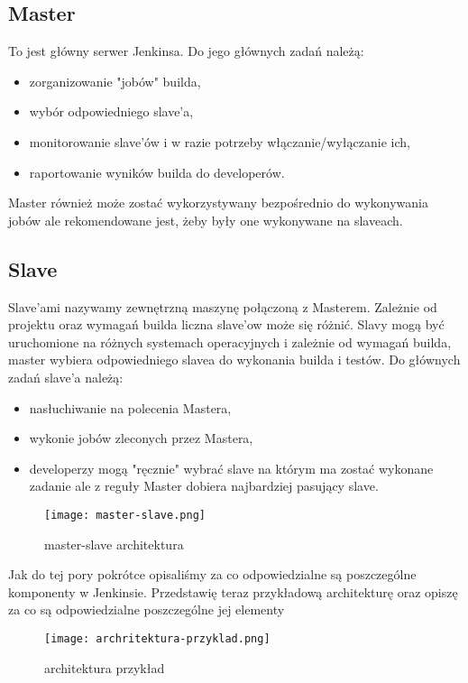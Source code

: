 \subsection{Master}

To jest główny serwer Jenkinsa. Do jego głównych zadań należą:
\begin{itemize}
    \item zorganizowanie "jobów" builda,
    \item wybór odpowiedniego slave'a,
    \item monitorowanie slave'ów i w razie potrzeby włączanie/wyłączanie ich,
    \item raportowanie wyników builda do developerów.
\end{itemize}

Master również może zostać wykorzystywany bezpośrednio do wykonywania jobów ale rekomendowane jest, żeby były one wykonywane na slaveach.

\subsection{Slave}

Slave'ami nazywamy zewnętrzną maszynę połączoną z Masterem. Zależnie od projektu oraz wymagań builda liczna slave'ow może się różnić. Slavy mogą być uruchomione na różnych systemach operacyjnych i zależnie od wymagań builda, master wybiera odpowiedniego slavea do wykonania builda i testów. 
Do głównych zadań slave'a należą:
\begin{itemize}
    \item nasłuchiwanie na polecenia Mastera,
    \item wykonie jobów zleconych przez Mastera,
    \item developerzy mogą "ręcznie" wybrać slave na którym ma zostać wykonane zadanie ale z reguły Master dobiera najbardziej pasujący slave.
\end{itemize}

\begin{figure}[htbp]
    \centering
    \texttt{[image: master-slave.png]}
    \caption{master-slave architektura}
    \label{fig:master-slave}
\end{figure}

Jak do tej pory pokrótce opisaliśmy za co odpowiedzialne są poszczególne komponenty w Jenkinsie. Przedstawię teraz przykładową architekturę oraz opiszę za co są odpowiedzialne poszczególne jej elementy 

\begin{figure}[htbp]
    \centering
    \texttt{[image: archritektura-przyklad.png]}
    \caption{architektura przykład}
    \label{fig:jenkins-architektura}
\end{figure}

